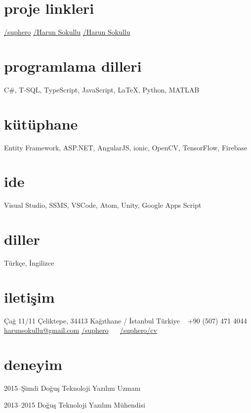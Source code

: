 \documentclass[]{../friggeri-cv} %
\begin{document}

\begin{aside}
\section{proje linkleri}
\href{https://github.com/suphero}{\faGithub/suphero}
\href{https://play.google.com/store/apps/developer?id=Harun+Sokullu}{\faAndroid/Harun Sokullu}
\href{https://itunes.apple.com/tr/developer/harun-sokullu/id1265151811}{\faApple/Harun Sokullu}
\section{programlama dilleri}
C\#, T-SQL, TypeScript, JavaScript, \LaTeX, Python, MATLAB
\section{kütüphane}
Entity Framework, ASP.NET, AngularJS, ionic, OpenCV, TensorFlow, Firebase
\section{ide}
Visual Studio, SSMS, VSCode, Atom, Unity, Google Apps Script
\section{diller}
Türkçe, İngilizce
\section{iletişim}
Çağ 11/11
Çeliktepe, 34413
Kağıthane / İstanbul
Türkiye
~
+90 (507) 471 4044
~
\href{mailto:harunsokullu@gmail.com}{harunsokullu@gmail.com}
\href{https://www.linkedin.com/in/suphero}{\faLinkedin/suphero}
~~
\href{https://github.com/suphero/cv/raw/master/Turkish/Harun\%20Sokullu.pdf}{\faGithub/suphero/cv}
\end{aside}

\section{deneyim}

\begin{entrylist}

\entry
{2015--Şimdi}
{Doğuş Teknoloji}{}
{Yazılım Uzmanı}

\entry
{2013--2015}
{Doğuş Teknoloji}{}
{Yazılım Mühendisi}

\end{entrylist}
\end{document}
